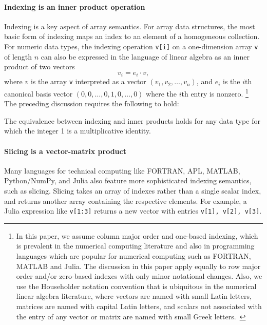 \paragraph{Indexing is an inner product operation}
Indexing is a key aspect of array semantics. For array data structures, the
most basic form of indexing maps an index to an element of a homogeneous
collection. For numeric data types, the indexing operation \lstinline|v[i]| on
a one-dimension array \lstinline|v| of length $n$ can also be expressed in the
language of linear algebra as an inner product of two vectors
\begin{equation}
	v_i = e_i \cdot v,\label{eq:idx1}
\end{equation}
where $v$ is the array \lstinline|v| interpreted as a vector $(v_1, v_2, \dots,
v_n)$, and $e_i$ is the $i$th canonical basis vector $(0, 0, \dots, 0, 1, 0,
\dots, 0)$ where the $i$th entry is nonzero.%
\footnote{In this paper, we assume column major order and one-based indexing,
which is prevalent in the numerical computing literature and also in
programming languages which are popular for numerical computing such as
FORTRAN, MATLAB and Julia. The discussion in this paper apply equally to row
major order and/or zero-based indexes with only minor notational changes. Also,
we use the Householder notation convention that is ubiquitous in the numerical
linear algebra literature, where vectors are named with small Latin letters,
matrices are named with capital Latin letters, and scalars not associated with
the entry of any vector or matrix are named with small Greek
letters.~\cite{Householder1964}}
The preceding discussion requires the following to hold:

The equivalence between indexing and inner products holds for
		any data type for which the integer 1 is a multiplicative
		identity.
%
%


\paragraph{Slicing is a vector-matrix product}
Many languages for technical computing like FORTRAN, APL, MATLAB, Python/NumPy,
and Julia also feature more sophisticated indexing semantics, such as slicing.
Slicing takes an array of indexes rather than a single scalar index, and returns
another array containing the respective elements. For example, a Julia
expression like \lstinline|v[1:3]| returns a new vector with entries
\lstinline|v[1], v[2], v[3]|.

